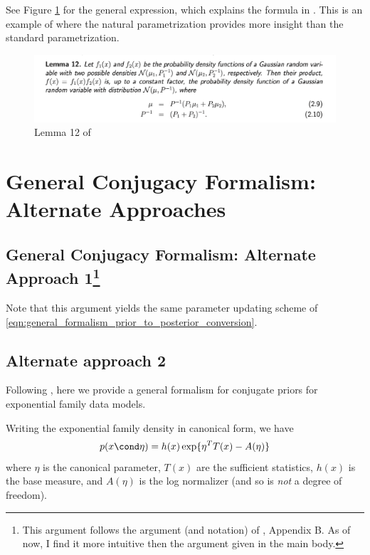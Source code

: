 \documentclass{article} %
\begin{document}
 See Figure \ref{fig:lemma_twelve_bickson} for the general expression, which explains the formula in  \cite{krishnan2016structured}.  This is an example of where the natural parametrization provides more insight than the standard parametrization. 

\begin{figure}[H]
\includegraphics[width=\textwidth]{images/bickson_lemma_12}
\caption{Lemma 12 of \cite{bickson2008gaussian}}
\label{fig:lemma_twelve_bickson}
\end{figure}

\section{General Conjugacy Formalism: Alternate Approaches}

\subsection{General Conjugacy Formalism: Alternate Approach 1\footnote{This argument follows the argument (and notation) of \cite{johnson2016composing}, Appendix B.  As of now, I find it more intuitive then the argument given in the main body.}}
\label{sec:general_conjugacy_alternate_argument}




Note that this argument yields the same parameter updating scheme of \eqref{eqn:general_formalism_prior_to_posterior_conversion}.


\subsection{Alternate approach 2} \label{sec:ef_general_formalism_jordan}

Following \cite{jordan_ef}, here we provide a general formalism for conjugate priors for exponential family data models. 

Writing the exponential family density in canonical form, we have
\[ p(x \cond \eta) = h(x) \exp \{ \eta^T T(x) - A(\eta) \} \]
where $\eta$ is the canonical parameter, $T(x)$ are the sufficient statistics,  $h(x)$ is the base measure, and $A(\eta)$ is the log normalizer (and so is \textit{not} a degree of freedom). 
\end{document}
